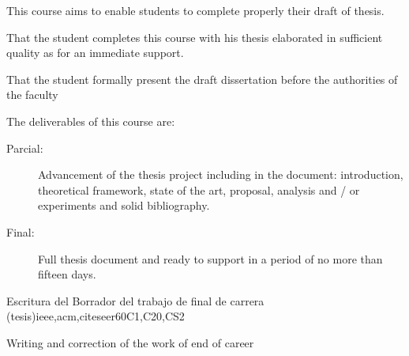 \begin{syllabus}


\begin{justification}
This course aims to enable students to complete properly their draft of  thesis.
\end{justification}

\begin{goals}
\item That the student completes this course with his thesis elaborated in sufficient quality as for an immediate support.
\item That the student formally present the draft dissertation before the authorities of the faculty
\item The deliverables of this course are:
	\begin{description}
	\item [Parcial:]Advancement of the thesis project including in the document: introduction, theoretical framework, state of the art, proposal, analysis and / or experiments and solid bibliography.
	\item [Final:] Full thesis document and ready to support in a period of no more than fifteen days.
	\end{description}
\end{goals}

\begin{outcomes}
\item {}
\item {}
\item {}
\item {}
\item {}
\item {}
\item {}
\item {}
\end{outcomes}

\begin{competences}
\item {} 
\item {}
\item {}
\end{competences}

\begin{unit}{Escritura del Borrador del trabajo de final de carrera (tesis)}{}{ieee,acm,citeseer}{60}{C1,C20,CS2}
\begin{topics}
    \item Writing and correction of the work of end of career
\end{topics}


\end{unit}
\end{syllabus}
